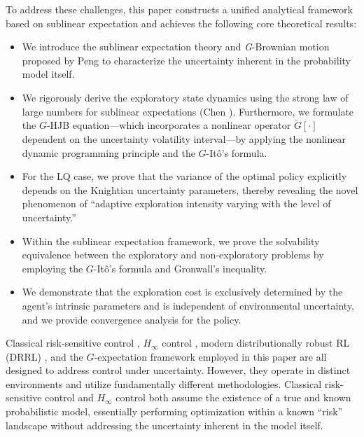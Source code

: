 \documentclass[onecolumn, journal]{IEEEtran} %
\begin{document}
	To address these challenges, this paper constructs a unified analytical framework based on sublinear expectation and achieves the following core theoretical results:
	
	\begin{itemize}
		\item We introduce the sublinear expectation theory and \textit{G}-Brownian motion proposed by Peng \cite{peng2010nonlinear} to characterize the uncertainty inherent in the probability model itself.
		
		\item We rigorously derive the exploratory state dynamics using the strong law of large numbers for sublinear expectations (Chen \cite{Chen2016}). Furthermore, we formulate the $G$-HJB equation—which incorporates a nonlinear operator $\widetilde{G}[\cdot]$ dependent on the uncertainty volatility interval—by applying the nonlinear dynamic programming principle \cite{chen2021optimal} and the $G$-Itô's formula.
		
		\item For the LQ case, we prove that the variance of the optimal policy explicitly depends on the Knightian uncertainty parameters, thereby revealing the novel phenomenon of ``adaptive exploration intensity varying with the level of uncertainty.''
		
		\item Within the sublinear expectation framework, we prove the solvability equivalence between the exploratory and non-exploratory problems by employing the $G$-Itô's formula and Gronwall's inequality.
		
		\item We demonstrate that the exploration cost is exclusively determined by the agent's intrinsic parameters and is independent of environmental uncertainty, and we provide convergence analysis for the policy.
	\end{itemize}
	
	
	Classical risk-sensitive control \cite{anugu2025ergodic}, $H_\infty$ control \cite{ma2024open}, modern distributionally robust RL (DRRL) \cite{shi2024distributionally}, and the $G$-expectation framework employed in this paper are all designed to address control under uncertainty. However, they operate in distinct environments and utilize fundamentally different methodologies. Classical risk-sensitive control and $H_\infty$ control both assume the existence of a true and known probabilistic model, essentially performing optimization within a known ``risk'' landscape without addressing the uncertainty inherent in the model itself.
	
\end{document}
